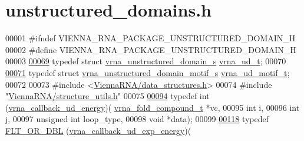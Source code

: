 \hypertarget{unstructured__domains_8h_source}{}\section{unstructured\+\_\+domains.\+h}
\label{unstructured__domains_8h_source}

\begin{DoxyCode}
00001 \textcolor{preprocessor}{#ifndef VIENNA\_RNA\_PACKAGE\_UNSTRUCTURED\_DOMAIN\_H}
00002 \textcolor{preprocessor}{#define VIENNA\_RNA\_PACKAGE\_UNSTRUCTURED\_DOMAIN\_H}
00003 
\mbox{\hyperlink{group__domains__up_ga0009117b14d29143e8b18ab891f48c2d}{00069}} \textcolor{keyword}{typedef} \textcolor{keyword}{struct }\mbox{\hyperlink{group__domains__up_structvrna__unstructured__domain__s}{vrna\_unstructured\_domain\_s}} \mbox{\hyperlink{group__domains__up_structvrna__unstructured__domain__s}{vrna\_ud\_t}};
00070 
\mbox{\hyperlink{unstructured__domains_8h_a2768620f2cfb9cbf87e99635c85b86e5}{00071}} \textcolor{keyword}{typedef} \textcolor{keyword}{struct }\mbox{\hyperlink{structvrna__unstructured__domain__motif__s}{vrna\_unstructured\_domain\_motif\_s}} 
      \mbox{\hyperlink{structvrna__unstructured__domain__motif__s}{vrna\_ud\_motif\_t}};
00072 
00073 \textcolor{preprocessor}{#include <\mbox{\hyperlink{data__structures_8h}{ViennaRNA/data\_structures.h}}>}
00074 \textcolor{preprocessor}{#include "\mbox{\hyperlink{structure__utils_8h}{ViennaRNA/structure\_utils.h}}"}
00075 
\mbox{\hyperlink{group__domains__up_ga75825c57d0bfde4ae4f95c044260c5c3}{00094}} \textcolor{keyword}{typedef} int (\mbox{\hyperlink{group__domains__up_ga75825c57d0bfde4ae4f95c044260c5c3}{vrna\_callback\_ud\_energy}})(
      \mbox{\hyperlink{group__fold__compound_structvrna__fc__s}{vrna\_fold\_compound\_t}}  *vc,
00095                                       \textcolor{keywordtype}{int}                   i,
00096                                       \textcolor{keywordtype}{int}                   j,
00097                                       \textcolor{keywordtype}{unsigned} \textcolor{keywordtype}{int}          loop\_type,
00098                                       \textcolor{keywordtype}{void}                  *data);
00099 
\mbox{\hyperlink{group__domains__up_ga861706f257ba993753464b823e65b86e}{00118}} \textcolor{keyword}{typedef} \mbox{\hyperlink{group__data__structures_ga31125aeace516926bf7f251f759b6126}{FLT\_OR\_DBL}} (\mbox{\hyperlink{group__domains__up_ga861706f257ba993753464b823e65b86e}{vrna\_callback\_ud\_exp\_energy}})(

\end{DoxyCode}
